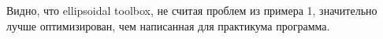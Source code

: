 \documentclass[10pt, a4paper]{article}
\begin{document}
Видно, что ellipsoidal toolbox, не считая проблем из примера 1, значительно лучше оптимизирован, чем написанная для практикума программа.

\newpage


\nocite{Kurzhanskiy:EECS-2006-46}
\nocite{Kurzhan_varaiya_discrete}

\end{document}

